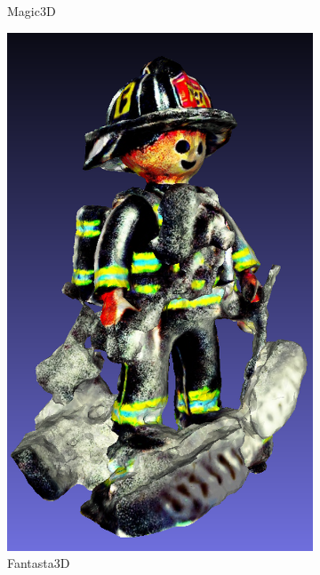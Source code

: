 \begin{figure}[ht]
\begin{subfigure}[b]{0.179\textwidth}
        \caption{Magic3D}
    \end{subfigure}
    \begin{subfigure}[b]{0.227\textwidth}
        \centering
        \includegraphics[width=\textwidth]{etc/a high quality rendering of a playmobil firefighter/fantasia3d_Magic3DInput/fantasia_playmobil_result_resize.png}
        \caption{Fantasta3D}
    \end{subfigure}
    \begin{subfigure}[b]{0.192\textwidth}
        \centering

\end{subfigure}
\end{figure}

